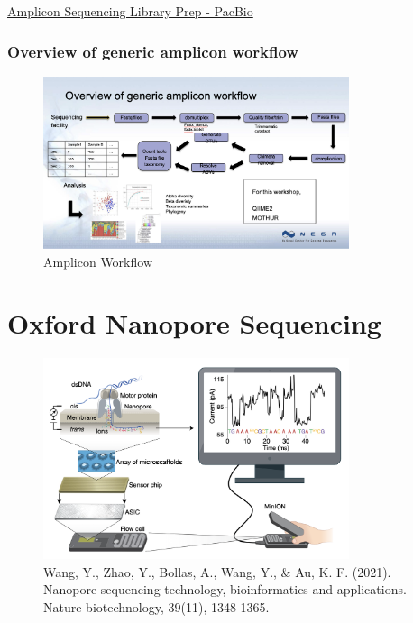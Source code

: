 \documentclass[
]{book}
\begin{document}
\href{https://www.pacb.com/wp-content/uploads/Multiplexed-Amplicon-Library-Preparation-Using-SMRTbell-Express-Template-Prep-Kit-2.0-–-Customer-Training.pdf}{Amplicon Sequencing Library Prep - PacBio}

\hypertarget{overview-of-generic-amplicon-workflow}{%
\subsubsection{Overview of generic amplicon workflow}\label{overview-of-generic-amplicon-workflow}}

\begin{figure}
\centering
\includegraphics[width=0.8\textwidth,height=\textheight]{./Figures/NCGRwkflo.png}
\caption{Amplicon Workflow}
\end{figure}

\hypertarget{oxford-nanopore-sequencing}{%
\section{Oxford Nanopore Sequencing}\label{oxford-nanopore-sequencing}}

\begin{figure}
\centering
\includegraphics[width=0.8\textwidth,height=\textheight]{./Figures/Nanopore1.png}
\caption{Wang, Y., Zhao, Y., Bollas, A., Wang, Y., \& Au, K. F. (2021). Nanopore sequencing technology, bioinformatics and applications. Nature biotechnology, 39(11), 1348-1365.}
\end{figure}
\end{document}
